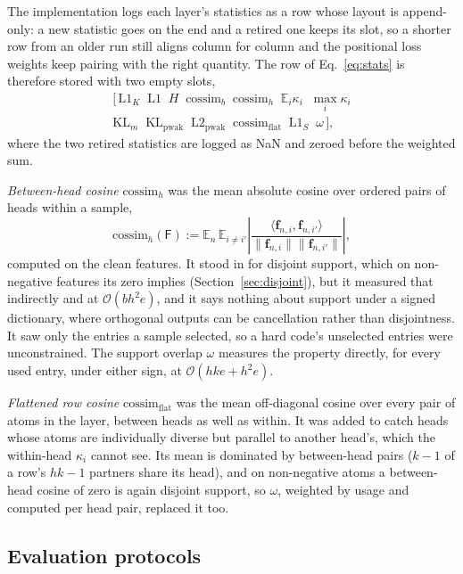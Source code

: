 The implementation logs each layer's statistics as a row whose layout is
append-only: a new statistic goes on the end and a retired one keeps its
slot, so a shorter row from an older run still aligns column for column
and the positional loss weights keep pairing with the right quantity.
The row of Eq.~\eqref{eq:stats} is therefore stored with two empty
slots,
\[
	\begin{gathered}
	\big[\,
	\mathrm{L1}_K \;\; \mathrm{L1} \;\; H \;\; \mathrm{cossim}_b \;\;
	\mathrm{cossim}_h \;\; \mathbb{E}_i\kappa_i \;\; \max_i \kappa_i
	\\
	\mathrm{KL}_m \;\; \mathrm{KL}_{\mathrm{pwak}} \;\; \mathrm{L2}_{\mathrm{pwak}}
	\;\; \mathrm{cossim}_{\mathrm{flat}} \;\; \mathrm{L1}_S \;\; \omega
	\,\big],
	\end{gathered}
\]
where the two retired statistics are logged as NaN and zeroed before the
weighted sum.

\emph{Between-head cosine} $\mathrm{cossim}_h$ was the mean absolute
cosine over ordered pairs of heads within a sample,
\[
	\mathrm{cossim}_h(\mathsf{F}) :=
	\mathbb{E}_{n}\,\mathbb{E}_{i \neq i'}\left\lvert
	\frac{\langle \mathbf{f}_{n,i}, \mathbf{f}_{n,i'}\rangle}
	     {\lVert \mathbf{f}_{n,i}\rVert \lVert \mathbf{f}_{n,i'}\rVert}
	\right\rvert,
\]
computed on the clean features. It stood in for disjoint support, which
on non-negative features its zero implies (Section~\ref{sec:disjoint}),
but it measured that indirectly and at $\mathcal{O}(bh^2e)$, and it
says nothing about support under a signed dictionary, where orthogonal
outputs can be cancellation rather than disjointness. It saw only the
entries a sample selected, so a hard code's unselected entries were
unconstrained. The support overlap $\omega$ measures the property
directly, for every used entry, under either sign, at $\mathcal{O}(hke +
h^2e)$.

\emph{Flattened row cosine} $\mathrm{cossim}_{\mathrm{flat}}$ was the mean
off-diagonal cosine over every pair of atoms in the layer, between heads
as well as within. It was added to catch heads whose atoms are
individually diverse but parallel to another head's, which the
within-head $\kappa_i$ cannot see. Its mean is dominated by between-head
pairs ($k-1$ of a row's $hk-1$ partners share its head), and on
non-negative atoms a between-head cosine of zero is again disjoint
support, so $\omega$, weighted by usage and computed per head pair,
replaced it too.

\subsection{Evaluation protocols}
\label{app:protocols}

